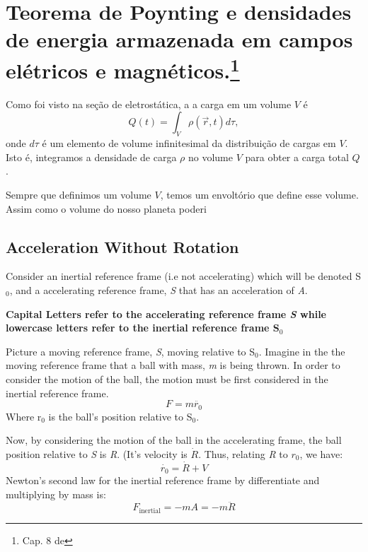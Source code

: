 \section[Teorema de Poynting]{Teorema de Poynting e densidades de energia armazenada em campos elétricos e magnéticos.\footnote{Cap. 8 de \griffiths}
}

Como foi visto na seção de eletrostática, a a carga em um volume $V$ é
\begin{equation}
  \label{carga}
Q(t) = \int_{V} \rho({\vec r},t)d\tau ,
\end{equation}
onde $d\tau$ é um elemento de volume infinitesimal da distribuição de cargas em $V$. Isto é, integramos a densidade de carga $\rho$ no volume $V$ para obter a carga total $Q$.

Sempre que definimos um volume $V$, temos um envoltório que define esse volume. Assim como o volume do nosso planeta poderi


\subsection{Acceleration Without Rotation}
Consider an inertial reference frame (i.e not accelerating) which will be denoted S$_0$, and a accelerating reference frame, \textit{S} that has an acceleration of \textit{A}.
\begin{note}
\textbf{Capital Letters refer to the accelerating reference frame \textit{S} while lowercase letters refer to the inertial reference frame S$_0$}
\end{note}
Picture a moving reference frame, \textit{S}, moving relative to S$_0$. Imagine in the the moving reference frame that a ball with mass, \textit{m} is being thrown. 
In order to consider the motion of the ball, the motion must be first considered in the inertial reference frame. 
\begin{equation}
F = m\ddot{r_0}
\end{equation}
Where r$_0$ is the ball's position relative to S$_0$. 

Now, by considering the motion of the ball in the accelerating frame, the ball position relative to \textit{S} is \textit{R}. (It's velocity is $\dot{R}$. 
Thus, relating \textit{R} to $r_0$, we have: 
\begin{equation}
\dot{r_0} = \dot{R} + V
\end{equation}
Newton's second law for the inertial reference frame by differentiate and multiplying by mass is:
\begin{equation}
F_{\text{inertial}} = -mA = -m\ddot{R}
\end{equation}